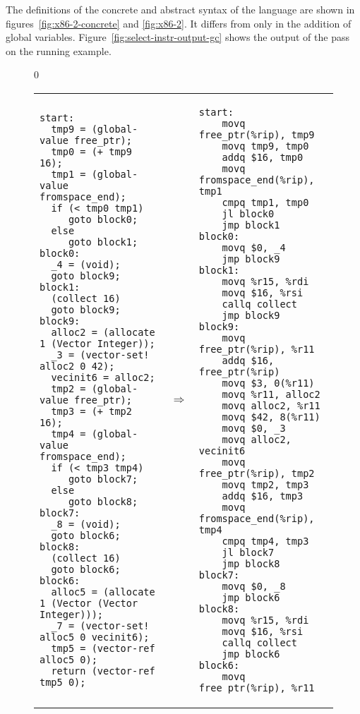 \documentclass[7x10]{TimesAPriori_MIT}%
\def\racketEd{0}
\def\edition{1}
\numberwithin{theorem}{chapter}
\numberwithin{definition}{chapter}
\numberwithin{equation}{chapter}
\begin{document}
The definitions of the concrete and abstract syntax of the
\LangXGlobal{} language are shown in figures~\ref{fig:x86-2-concrete}
and \ref{fig:x86-2}.  It differs from \LangXIf{} only in the addition
of global variables.
%
Figure~\ref{fig:select-instr-output-gc} shows the output of the
 pass on the running example.

\begin{figure}[tbp]
\centering
\begin{tcolorbox}[colback=white]
{\if\edition\racketEd    
\begin{tabular}{lll}
\begin{minipage}{0.5\textwidth}
\begin{lstlisting}[basicstyle=\ttfamily\scriptsize]
start:
  tmp9 = (global-value free_ptr);
  tmp0 = (+ tmp9 16);
  tmp1 = (global-value fromspace_end);
  if (< tmp0 tmp1)
     goto block0;
  else
     goto block1;
block0:
  _4 = (void);
  goto block9;
block1:
  (collect 16)
  goto block9;
block9:
  alloc2 = (allocate 1 (Vector Integer));
  _3 = (vector-set! alloc2 0 42);
  vecinit6 = alloc2;
  tmp2 = (global-value free_ptr);
  tmp3 = (+ tmp2 16);
  tmp4 = (global-value fromspace_end);
  if (< tmp3 tmp4)
     goto block7;
  else
     goto block8;
block7:
  _8 = (void);
  goto block6;
block8:
  (collect 16)
  goto block6;
block6:
  alloc5 = (allocate 1 (Vector (Vector Integer)));
  _7 = (vector-set! alloc5 0 vecinit6);
  tmp5 = (vector-ref alloc5 0);
  return (vector-ref tmp5 0);
\end{lstlisting}
\end{minipage}
&$\Rightarrow$&
\begin{minipage}{0.4\textwidth}
\begin{lstlisting}[basicstyle=\ttfamily\scriptsize]
start:
    movq free_ptr(%rip), tmp9
    movq tmp9, tmp0
    addq $16, tmp0
    movq fromspace_end(%rip), tmp1
    cmpq tmp1, tmp0
    jl block0
    jmp block1
block0:
    movq $0, _4
    jmp block9
block1:
    movq %r15, %rdi
    movq $16, %rsi
    callq collect
    jmp block9
block9:
    movq free_ptr(%rip), %r11
    addq $16, free_ptr(%rip)
    movq $3, 0(%r11)
    movq %r11, alloc2
    movq alloc2, %r11
    movq $42, 8(%r11)
    movq $0, _3
    movq alloc2, vecinit6
    movq free_ptr(%rip), tmp2
    movq tmp2, tmp3
    addq $16, tmp3
    movq fromspace_end(%rip), tmp4
    cmpq tmp4, tmp3
    jl block7
    jmp block8
block7:
    movq $0, _8
    jmp block6
block8:
    movq %r15, %rdi
    movq $16, %rsi
    callq collect
    jmp block6
block6:
    movq free_ptr(%rip), %r11

\end{lstlisting}
\end{minipage}
\end{tabular}}
\end{tcolorbox}
\end{figure}
\end{document}
